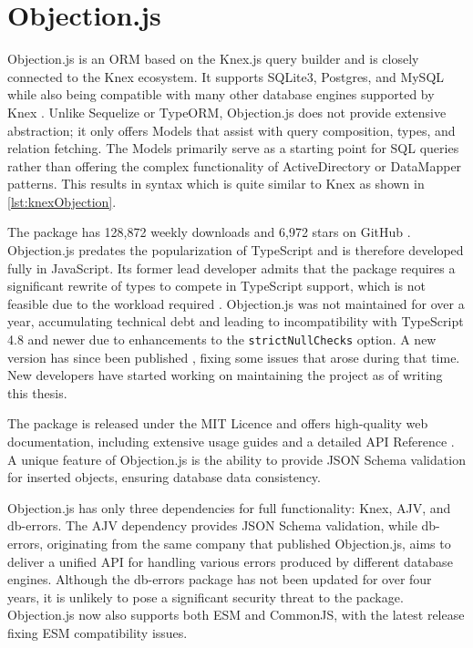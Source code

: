 \section{Objection.js}
Objection.js is an ORM based on the Knex.js query builder and is closely
connected to the Knex ecosystem. It supports SQLite3, Postgres, and MySQL while
also being compatible with many other database engines supported by Knex
\cite{objectionGitHub}. Unlike Sequelize or TypeORM, Objection.js does not
provide extensive abstraction; it only offers Models that assist with query
composition, types, and relation fetching. The Models primarily serve as a
starting point for SQL queries rather than offering the complex functionality of
ActiveDirectory or DataMapper patterns. This results in syntax which is quite
similar to Knex as shown in \autoref{lst:knexObjection}.

The package has 128,872 weekly downloads \cite{objectionNpm} and 6,972 stars on
GitHub \cite{objectionGitHub}. Objection.js predates the popularization of
TypeScript and is therefore developed fully in JavaScript. Its former lead
developer admits that the package requires a significant rewrite of types to
compete in TypeScript support, which is not feasible due to the workload
required \cite{objectionFuture}. Objection.js was not maintained for over a
year, accumulating technical debt and leading to incompatibility with TypeScript
4.8 and newer due to enhancements to the \texttt{strictNullChecks} option. A new
version has since been published \cite{objection302}, fixing some issues that
arose during that time. New developers have started working on maintaining the
project as of writing this thesis.

The package is released under the MIT Licence and offers high-quality web
documentation, including extensive usage guides and a detailed API Reference
\cite{objectionDocs}. A unique feature of Objection.js is the ability to provide
JSON Schema validation for inserted objects, ensuring database data consistency.

Objection.js has only three dependencies for full functionality: Knex, AJV, and
db-errors. The AJV dependency provides JSON Schema validation, while db-errors,
originating from the same company that published Objection.js, aims to deliver a
unified API for handling various errors produced by different database engines.
Although the db-errors package has not been updated for over four years, it is
unlikely to pose a significant security threat to the package. Objection.js now
also supports both ESM and CommonJS, with the latest release fixing ESM
compatibility issues.

